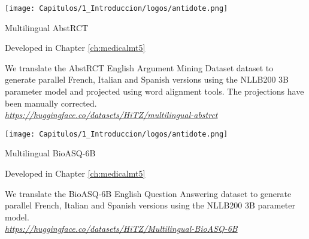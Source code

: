 \begin{resources}
    {
    \begin{adjustbox}{valign=c}
    \texttt{[image: Capitulos/1\_Introduccion/logos/antidote.png]}
    \end{adjustbox}
    \begin{adjustbox}{valign=c}
    \begin{minipage}{\textwidth}
    Multilingual AbstRCT
    \end{minipage}
    \end{adjustbox}
    }
    \begin{resourcessmall}
    Developed in Chapter \ref{ch:medicalmt5}
    \end{resourcessmall}
    We translate the AbstRCT English Argument Mining Dataset dataset to generate parallel French, Italian and Spanish versions using the NLLB200 3B parameter model and projected using word alignment tools. The projections have been manually corrected.  \\
    \textit{\href{https://huggingface.co/datasets/HiTZ/multilingual-abstrct}{https://huggingface.co/datasets/HiTZ/multilingual-abstrct}}
\end{resources}
\clearpage
\begin{resources}
    {
    \begin{adjustbox}{valign=c}
    \texttt{[image: Capitulos/1\_Introduccion/logos/antidote.png]}
    \end{adjustbox}
    \begin{adjustbox}{valign=c}
    \begin{minipage}{\textwidth}
    Multilingual BioASQ-6B
    \end{minipage}
    \end{adjustbox}
    }
    \begin{resourcessmall}
    Developed in Chapter \ref{ch:medicalmt5}
    \end{resourcessmall}
    We translate the BioASQ-6B English Question Answering dataset to generate parallel French, Italian and Spanish versions using the NLLB200 3B parameter model.  \\
    \textit{\href{https://huggingface.co/datasets/HiTZ/Multilingual-BioASQ-6B}{https://huggingface.co/datasets/HiTZ/Multilingual-BioASQ-6B}}
\end{resources}

